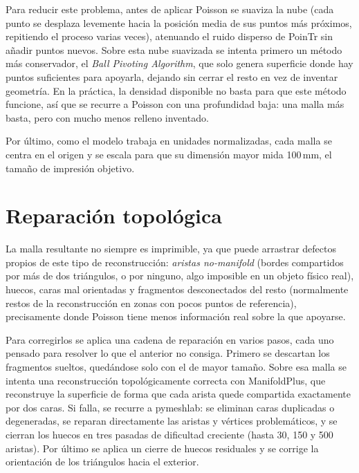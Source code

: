 \documentclass[10pt,a4paper]{report}
\begin{document}
Para reducir este problema, antes de aplicar Poisson se suaviza la nube (cada punto se
desplaza levemente hacia la posición media de sus puntos más próximos, repitiendo el
proceso varias veces), atenuando el ruido disperso de PoinTr sin añadir puntos nuevos.
Sobre esta nube suavizada se intenta primero un método más conservador, el
\textit{Ball Pivoting Algorithm}, que solo genera superficie donde hay puntos
suficientes para apoyarla, dejando sin cerrar el resto en vez de inventar geometría.
En la práctica, la densidad disponible no basta para que este método funcione, así que
se recurre a Poisson con una profundidad baja: una malla más basta, pero con mucho
menos relleno inventado.

Por último, como el modelo trabaja en unidades normalizadas, cada malla se centra en
el origen y se escala para que su dimensión mayor mida 100\,mm, el tamaño de impresión
objetivo.

\section{Reparación topológica}
\label{sec:reparacion}

La malla resultante no siempre es imprimible, ya que puede arrastrar defectos propios
de este tipo de reconstrucción: \textit{aristas no-manifold} (bordes compartidos por
más de dos triángulos, o por ninguno, algo imposible en un objeto físico real), huecos,
caras mal orientadas y fragmentos desconectados del resto (normalmente restos de la
reconstrucción en zonas con pocos puntos de referencia), precisamente donde Poisson
tiene menos información real sobre la que apoyarse.

Para corregirlos se aplica una cadena de reparación en varios pasos, cada uno pensado
para resolver lo que el anterior no consiga. Primero se descartan los fragmentos
sueltos, quedándose solo con el de mayor tamaño. Sobre esa malla se intenta una
reconstrucción topológicamente correcta con
ManifoldPlus, que reconstruye la superficie de forma que
cada arista quede compartida exactamente por dos caras. Si falla, se recurre a
pymeshlab: se eliminan caras duplicadas o degeneradas, se reparan directamente las
aristas y vértices problemáticos, y se cierran los huecos en tres pasadas de dificultad
creciente (hasta 30, 150 y 500 aristas). Por último se aplica un cierre de huecos
residuales y se corrige la orientación de los triángulos hacia el exterior.
\end{document}
